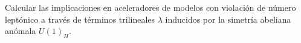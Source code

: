 


 Calcular las implicaciones en aceleradores de modelos con violación 
de número leptónico a través de términos trilineales $\lambda$ inducidos por la simetría 
abeliana anómala $U(1)_H$.

